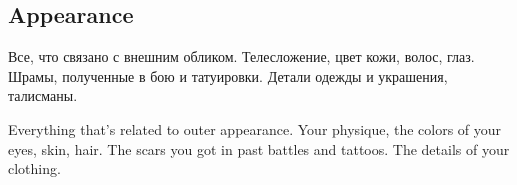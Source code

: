 \documentclass[a5paper,11pt]{book}
\begin{document}
\begin{multicols}{2}
\section{Appearance}
\begin{ru}
Все, что связано с внешним обликом. Телесложение, цвет кожи, волос, глаз. Шрамы, полученные в бою и татуировки. Детали одежды и украшения, талисманы.
\end{ru}

\begin{en}
Everything that's related to outer appearance. Your physique, the colors of your eyes, skin, hair. The scars you got in past battles and tattoos. The details of your clothing.
\end{en}

\end{multicols}

\end{document}
